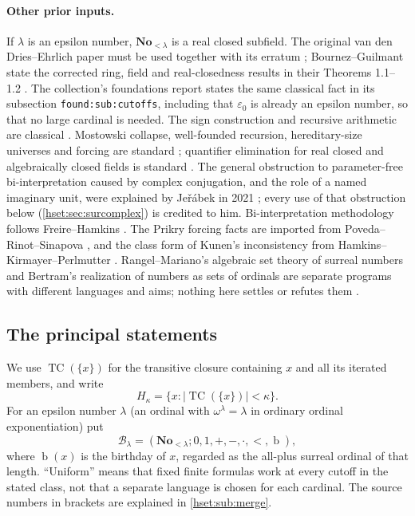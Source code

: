 \documentclass[11pt,letterpaper]{article}
\theoremstyle{definition}
\theoremstyle{remark}
\newcommand{\No}{\mathbf{No}}
\newcommand{\bd}{\operatorname{b}}
\newcommand{\TC}{\operatorname{TC}}
\newcommand{\B}{\mathcal B}
\newcommand{\card}[1]{\lvert#1\rvert}
\newcommand{\lbl}[1]{\nolinkurl{#1}}
\begin{document}
\paragraph{Other prior inputs.}
If $\lambda$ is an epsilon number, $\No_{<\lambda}$ is a real closed subfield.
The original van den Dries--Ehrlich paper must be used together with its
erratum \cite{vdDE,vdDEerr}; Bournez--Guilmant state the corrected ring, field
and real-closedness results in their Theorems 1.1--1.2 \cite{BG}. The
collection's foundations report states the same classical fact in its
subsection \lbl{found:sub:cutoffs}, including that $\varepsilon_0$ is already an
epsilon number, so that no large cardinal is needed. The sign construction and
recursive arithmetic are classical \cite{Conway,Gonshor}. Mostowski collapse,
well-founded recursion, hereditary-size universes and forcing are standard
\cite{Jech}; quantifier elimination for real closed and algebraically closed
fields is standard \cite{Marker,Deloro}. The general obstruction to
parameter-free bi-interpretation caused by complex conjugation, and the role of
a named imaginary unit, were explained by Je\v{r}\'abek in 2021 \cite{Jerabek};
every use of that obstruction below (\cref{hset:sec:surcomplex}) is credited to
him. Bi-interpretation methodology follows Freire--Hamkins \cite{FreireHamkins}.
The Prikry forcing facts are imported from Poveda--Rinot--Sinapova \cite{PRS},
and the class form of Kunen's inconsistency from
Hamkins--Kirmayer--Perlmutter \cite{HKP}. Rangel--Mariano's algebraic set
theory of surreal numbers and Bertram's realization of numbers as sets of
ordinals are separate programs with different languages and aims; nothing here
settles or refutes them \cite{RM,Bertram}.

\subsection{The principal statements}
\label{hset:sub:results}

We use $\TC(\{x\})$ for the transitive closure containing $x$ and all its
iterated members, and write
\[
 H_\kappa=\{x:\card{\TC(\{x\})}<\kappa\}.
\]
For an epsilon number $\lambda$ (an ordinal with $\omega^\lambda=\lambda$ in
ordinary ordinal exponentiation) put
\[
 \B_\lambda=(\No_{<\lambda};0,1,+,-,\cdot,<,\bd),
\]
where $\bd(x)$ is the birthday of $x$, regarded as the all-plus surreal
ordinal of that length. ``Uniform'' means that fixed finite formulas work at
every cutoff in the stated class, not that a separate language is chosen for
each cardinal. The source numbers in brackets are explained in
\cref{hset:sub:merge}.
\end{document}
